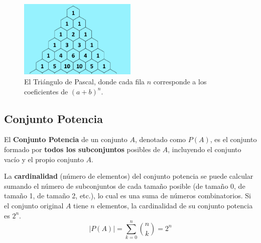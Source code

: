 \documentclass[12pt, letterpaper]{article}
\begin{document}
\begin{figure}[h!]
	\centering
	\includegraphics[width=0.5\textwidth]{pascal}
	\caption{El Triángulo de Pascal, donde cada fila $n$ corresponde a los coeficientes de $(a+b)^n$.}
	\label{fig:pascaltrig}
\end{figure}

\subsection{Conjunto Potencia}
El \textbf{Conjunto Potencia} de un conjunto $A$, denotado como $P(A)$, es el conjunto formado por \textbf{todos los subconjuntos} posibles de $A$, incluyendo el conjunto vacío y el propio conjunto $A$.

La \textbf{cardinalidad} (número de elementos) del conjunto potencia se puede calcular sumando el número de subconjuntos de cada tamaño posible (de tamaño 0, de tamaño 1, de tamaño 2, etc.), lo cual es una suma de números combinatorios. Si el conjunto original $A$ tiene $n$ elementos, la cardinalidad de su conjunto potencia es $2^n$.
\[ |P(A)| = \sum_{k=0}^{n} \binom{n}{k} = 2^n \]
\end{document}
